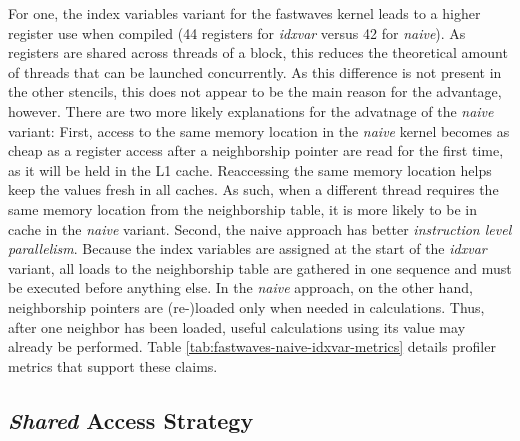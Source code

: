For one, the index variables variant for the fastwaves kernel leads to a higher register use when compiled (44 registers for \emph{idxvar} versus 42 for \emph{naive}). As registers are shared across threads of a block, this reduces the theoretical amount of threads that can be launched concurrently. As this difference is not present in the other stencils, this does not appear to be the main reason for the advantage, however. There are two more likely explanations for the advatnage of the \emph{naive} variant: First, access to the same memory location in the \emph{naive} kernel becomes as cheap as a register access after a neighborship pointer are read for the first time, as it will be held in the L1 cache. Reaccessing the same memory location helps keep the values fresh in all caches. As such, when a different thread requires the same memory location from the neighborship table, it is more likely to be in cache in the \emph{naive} variant. Second, the naive approach has better \emph{instruction level parallelism}. Because the index variables are assigned at the start of the \emph{idxvar} variant, all loads to the neighborship table are gathered in one sequence and must be executed before anything else. In the \emph{naive} approach, on the other hand, neighborship pointers are (re-)loaded only when needed in calculations. Thus, after one neighbor has been loaded, useful calculations using its value may already be performed. Table \ref{tab:fastwaves-naive-idxvar-metrics} details profiler metrics that support these claims.


\subsection{\emph{Shared} Access Strategy}

